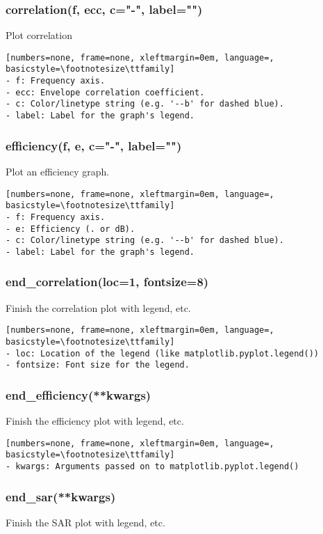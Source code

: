 \subsubsection{correlation(f, ecc, c="-", label="")}
Plot correlation

\begin{lstlisting}[numbers=none, frame=none, xleftmargin=0em, language=, basicstyle=\footnotesize\ttfamily]
- f: Frequency axis.
- ecc: Envelope correlation coefficient.
- c: Color/linetype string (e.g. '--b' for dashed blue).
- label: Label for the graph's legend.
\end{lstlisting}

\subsubsection{efficiency(f, e, c="-", label="")}
Plot an efficiency graph.

\begin{lstlisting}[numbers=none, frame=none, xleftmargin=0em, language=, basicstyle=\footnotesize\ttfamily]
- f: Frequency axis.
- e: Efficiency (. or dB).
- c: Color/linetype string (e.g. '--b' for dashed blue).
- label: Label for the graph's legend.
\end{lstlisting}

\subsubsection{end\_correlation(loc=1, fontsize=8)}
Finish the correlation plot with legend, etc.

\begin{lstlisting}[numbers=none, frame=none, xleftmargin=0em, language=, basicstyle=\footnotesize\ttfamily]
- loc: Location of the legend (like matplotlib.pyplot.legend())
- fontsize: Font size for the legend.
\end{lstlisting}

\subsubsection{end\_efficiency(**kwargs)}
Finish the efficiency plot with legend, etc.

\begin{lstlisting}[numbers=none, frame=none, xleftmargin=0em, language=, basicstyle=\footnotesize\ttfamily]
- kwargs: Arguments passed on to matplotlib.pyplot.legend()
\end{lstlisting}

\subsubsection{end\_sar(**kwargs)}
Finish the SAR plot with legend, etc.

